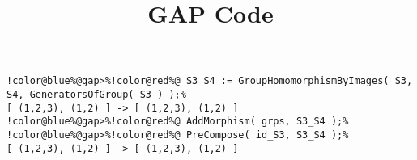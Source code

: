 \documentclass[12pt]{amsart}
\title{GAP Code}
\author{}
\begin{document}
\maketitle

\begin{Verbatim}[commandchars=!@\%,frame=single]
!color@blue%@gap>%!color@red%@ S3_S4 := GroupHomomorphismByImages( S3, S4, GeneratorsOfGroup( S3 ) );%
[ (1,2,3), (1,2) ] -> [ (1,2,3), (1,2) ]
!color@blue%@gap>%!color@red%@ AddMorphism( grps, S3_S4 );%
!color@blue%@gap>%!color@red%@ PreCompose( id_S3, S3_S4 );%
[ (1,2,3), (1,2) ] -> [ (1,2,3), (1,2) ]
\end{Verbatim}
\end{document}
